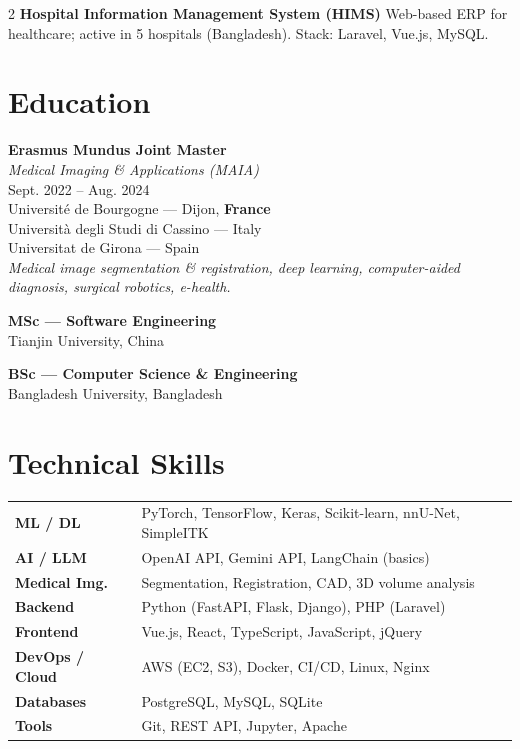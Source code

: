 \documentclass[10pt, a4paper]{article}
\newcommand{\skill}[2]{\textbf{#1} & \small #2 \\[2pt]}
\begin{document}
\begin{paracol}{2}
\vspace{3pt}
\textbf{Hospital Information Management System (HIMS)}\newline
Web-based ERP for healthcare; active in 5 hospitals (Bangladesh).
Stack: Laravel, Vue.js, MySQL.

\switchcolumn


\section{Education}

\textbf{Erasmus Mundus Joint Master}\\
\textit{Medical Imaging \& Applications (MAIA)}\\
\textcolor{accent}{\small Sept. 2022 – Aug. 2024}\\[1pt]
{\small
Université de Bourgogne — Dijon, \textbf{France}\\
Università degli Studi di Cassino — Italy\\
Universitat de Girona — Spain\\[2pt]
\textit{Medical image segmentation \& registration,
deep learning, computer-aided diagnosis, surgical robotics, e-health.}
}

\vspace{5pt}
\textbf{MSc — Software Engineering}\\
{\small Tianjin University, China}

\vspace{4pt}
\textbf{BSc — Computer Science \& Engineering}\\
{\small Bangladesh University, Bangladesh}

\section{Technical Skills}

\begin{tabularx}{\linewidth}{@{}lX@{}}
\skill{ML / DL}{PyTorch, TensorFlow, Keras, Scikit-learn, nnU-Net, SimpleITK}
\skill{AI / LLM}{OpenAI API, Gemini API, LangChain (basics)}
\skill{Medical Img.}{Segmentation, Registration, CAD, 3D volume analysis}
\skill{Backend}{Python (FastAPI, Flask, Django), PHP (Laravel)}
\skill{Frontend}{Vue.js, React, TypeScript, JavaScript, jQuery}
\skill{DevOps / Cloud}{AWS (EC2, S3), Docker, CI/CD, Linux, Nginx}
\skill{Databases}{PostgreSQL, MySQL, SQLite}
\skill{Tools}{Git, REST API, Jupyter, Apache}
\end{tabularx}


\end{paracol}
\end{document}
